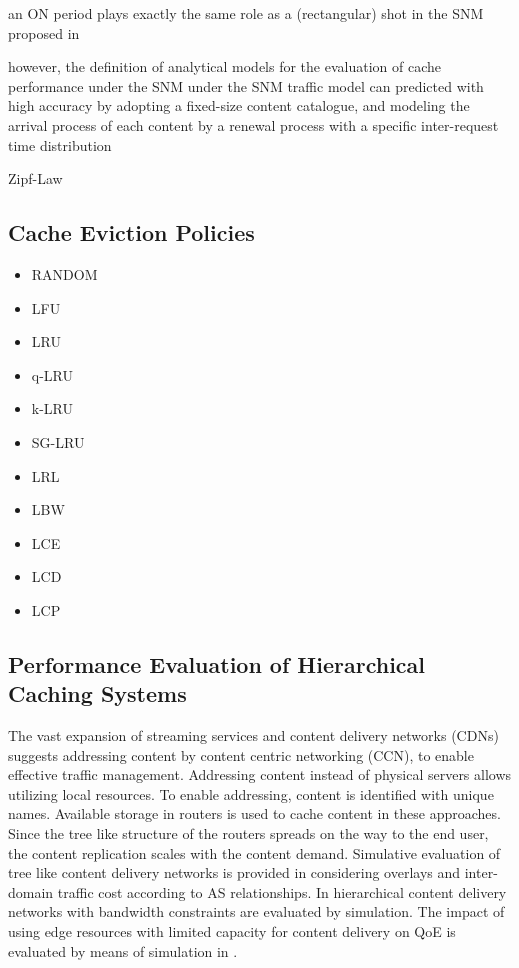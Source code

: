 an ON
period  plays  exactly  the  same  role  as  a  (rectangular) shot  in
the SNM proposed in

however, the definition of analytical models for the evaluation of cache performance under the SNM
under the SNM traffic model can predicted with high accuracy by adopting a fixed-size content catalogue, and modeling the arrival process of each content by a renewal process with a specific inter-request time distribution


Zipf-Law

\subsection{Cache Eviction Policies}
\begin{itemize}
  \item RANDOM
  \item LFU
  \item LRU
  \item q-LRU
  \item k-LRU
  \item SG-LRU
  \item LRL
  \item LBW
\end{itemize}

\begin{itemize}
  \item LCE
  \item LCD
  \item LCP
\end{itemize}

\subsection{Performance Evaluation of Hierarchical Caching Systems}
The vast expansion of streaming services and content delivery networks (CDNs) suggests addressing content by content centric networking (CCN), to enable effective traffic management.
Addressing content instead of physical servers allows utilizing local resources.
To enable addressing, content is identified with unique names.
Available storage in routers is used to cache content in these approaches.
Since the tree like structure of the routers spreads on the way to the end user, the content replication scales with the content demand.
Simulative evaluation of tree like content delivery networks is provided in \cite{lareida2015augmenting} considering overlays and inter-domain traffic cost according to AS relationships.
In \cite{applegate2010optimal} hierarchical content delivery networks with bandwidth constraints are evaluated by simulation. The impact of using edge resources with limited capacity for content delivery on QoE is evaluated by means of simulation in \cite{info3-inproceedings-2015-530}.

